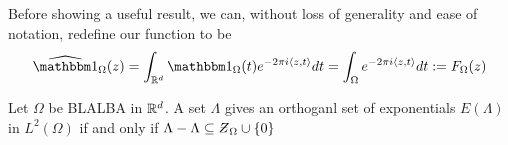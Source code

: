 \documentclass[../thesis.tex]{subfiles}
\begin{document}
Before showing a useful result, we can, without loss of generality and ease of notation, redefine our function to be
\begin{equation*}
    \indicatorFourier{\Omega}{z} = \int_{\R^d} \indicator{\Omega}{t}  e^{-2\pi i \braa{z,t}} dt = \int_{\Omega} e^{-2\pi i \braa{z,t}} dt := F_{\Omega}(z)
\end{equation*}

\begin{lemma}
    Let $\Omega$ be BLALBA in $\mathbb{R}^d$. A set $\Lambda$ gives an orthoganl set of exponentials $E(\Lambda)$ in $L^2(\Omega)$ if and only if
    $\Lambda - \Lambda \subseteq \Zstroke_{\Omega} \cup \braq{0}$


\end{lemma}
\end{document}
